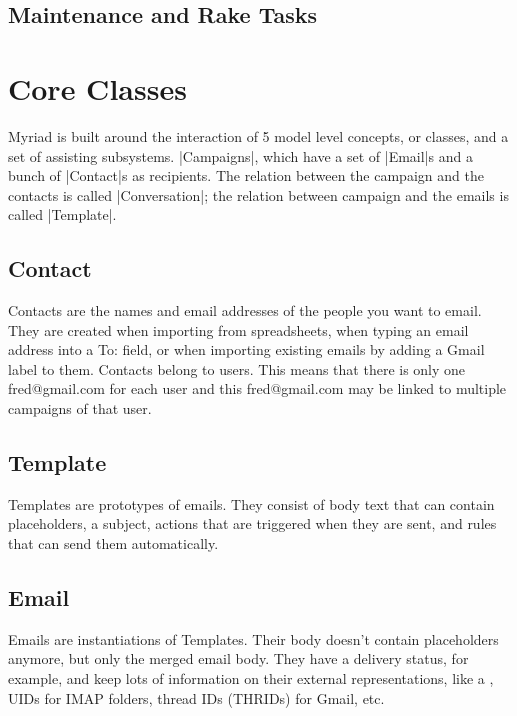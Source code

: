 \subsection{Maintenance and Rake Tasks}


\pagebreak
\section{Core Classes}

Myriad is built around the interaction of 5 model level concepts, or classes, and a set of assisting subsystems.
|Campaigns|, which have a set of |Email|s and a bunch of |Contact|s as recipients. The relation between the campaign and the contacts is called |Conversation|; the relation between campaign and the emails is called |Template|.



\subsection{Contact}

Contacts are the names and email addresses of the people you want to email.
They are created when importing from spreadsheets, when typing an email address into a To: field, or when importing existing emails by adding a Gmail label to them. Contacts belong to users. This means that there is only one fred@gmail.com for each user and this fred@gmail.com may be linked to multiple campaigns of that user.

\subsection{Template}

Templates are prototypes of emails. They consist of body text that can contain placeholders, a subject, actions that are triggered when they are sent, and rules that can send them automatically.

\subsection{Email}

Emails are instantiations of Templates. Their body doesn’t contain placeholders anymore, but only the merged email body. They have a delivery status, for example, and keep lots of information on their external representations, like a , UIDs for IMAP folders, thread IDs (THRIDs) for Gmail, etc.

